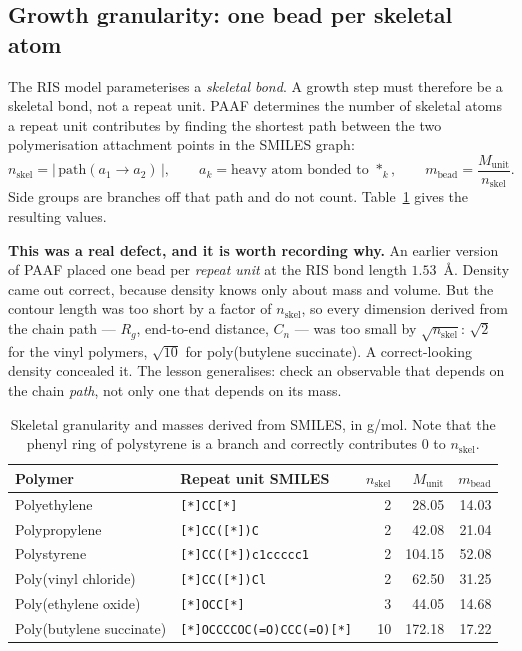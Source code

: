 \documentclass[11pt,a4paper]{article}
\begin{document}
\subsection{Growth granularity: one bead per skeletal atom}

The RIS model parameterises a \emph{skeletal bond}. A growth step must
therefore be a skeletal bond, not a repeat unit. PAAF determines the number of
skeletal atoms a repeat unit contributes by finding the shortest path between
the two polymerisation attachment points in the SMILES graph:
\begin{equation}
  n_{\text{skel}} = \bigl|\,\mathrm{path}(a_1 \to a_2)\,\bigr| ,
  \qquad a_k = \text{heavy atom bonded to } \ast_k ,
  \qquad
  m_{\text{bead}} = \frac{M_{\text{unit}}}{n_{\text{skel}}} .
  \label{eq:granularity}
\end{equation}
Side groups are branches off that path and do not count.
Table~\ref{tab:gran} gives the resulting values.

\begin{caveat}
\textbf{This was a real defect, and it is worth recording why.} An earlier
version of PAAF placed one bead per \emph{repeat unit} at the RIS bond length
$1.53$~\AA. Density came out correct, because density knows only about mass
and volume. But the contour length was too short by a factor of
$n_{\text{skel}}$, so every dimension derived from the chain path --- $R_g$,
end-to-end distance, $C_n$ --- was too small by $\sqrt{n_{\text{skel}}}$:
$\sqrt{2}$ for the vinyl polymers, $\sqrt{10}$ for poly(butylene succinate).
A correct-looking density concealed it. The lesson generalises: check an
observable that depends on the chain \emph{path}, not only one that depends on
its mass.
\end{caveat}

\begin{table}[t]
\centering
\small
\begin{tabular}{llrrr}
\toprule
Polymer & Repeat unit SMILES & $n_{\text{skel}}$ & $M_{\text{unit}}$ & $m_{\text{bead}}$ \\
\midrule
Polyethylene            & \texttt{[*]CC[*]}                     & 2  & 28.05  & 14.03 \\
Polypropylene           & \texttt{[*]CC([*])C}                  & 2  & 42.08  & 21.04 \\
Polystyrene             & \texttt{[*]CC([*])c1ccccc1}           & 2  & 104.15 & 52.08 \\
Poly(vinyl chloride)    & \texttt{[*]CC([*])Cl}                 & 2  & 62.50  & 31.25 \\
Poly(ethylene oxide)    & \texttt{[*]OCC[*]}                    & 3  & 44.05  & 14.68 \\
Poly(butylene succinate)& \texttt{[*]OCCCCOC(=O)CCC(=O)[*]}     & 10 & 172.18 & 17.22 \\
\bottomrule
\end{tabular}
\caption{Skeletal granularity and masses derived from SMILES, in g/mol. Note
that the phenyl ring of polystyrene is a branch and correctly contributes
$0$ to $n_{\text{skel}}$.}
\label{tab:gran}
\end{table}
\end{document}
